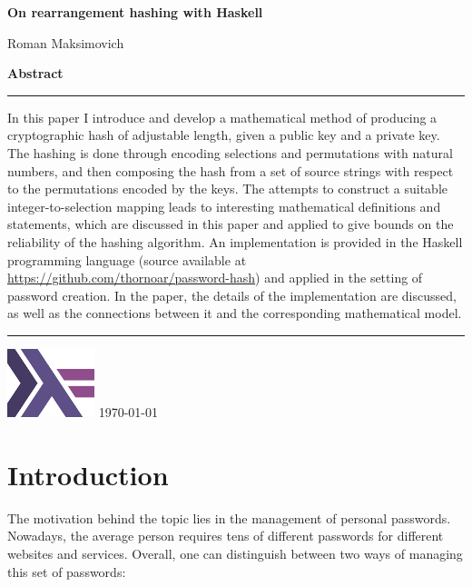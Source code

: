 \documentclass[12pt, a4paper]{article}
\begin{document}
\thispagestyle{empty}
\vspace*{.6in}
{ \Huge\bfseries On rearrangement hashing with Haskell }\par
\vspace*{.1in}
{ \Large Roman Maksimovich }
\par
\vspace*{3.5in}
{ \Large\bfseries Abstract }\par
\vspace*{.1in}
\hrule
\vspace*{.1in}
\begin{minipage}{0.9\textwidth}
    In this paper I introduce and develop a mathematical method of producing a cryptographic hash of adjustable length, given a public key and a private key. The hashing is done through encoding selections and permutations with natural numbers, and then composing the hash from a set of source strings with respect to the permutations encoded by the keys. The attempts to construct a suitable integer-to-selection mapping leads to interesting mathematical definitions and statements, which are discussed in this paper and applied to give bounds on the reliability of the hashing algorithm. An implementation is provided in the Haskell programming language (source available at \url{https://github.com/thornoar/password-hash}) and applied in the setting of password creation. In the paper, the details of the implementation are discussed, as well as the connections between it and the corresponding mathematical model.
\end{minipage}
\vspace*{.1in}
\hrule
\vspace*{.2in}
\begin{center}
    \includegraphics[width = 1in]{./figures/haskell.png}
    \vfill
    \today
\end{center}

\newpage
\tableofcontents
\newpage

\section{Introduction}

The motivation behind the topic lies in the management of personal passwords. Nowadays, the average person requires tens of different passwords for different websites and services. Overall, one can distinguish between two ways of managing this set of passwords:
\end{document}
